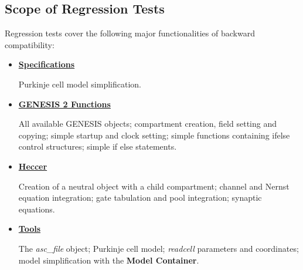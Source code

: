 \documentclass[12pt]{article}
\begin{document}
\subsection*{Scope of Regression Tests}

Regression tests cover the following major functionalities of backward compatibility:
\begin{itemize}
\item[]\href{http://www.neurospaces.org/neurospaces_project/ns-sli/tests/html/specifications/main.html}{\bf Specifications}

Purkinje cell model simplification.

\item[]\href{http://www.neurospaces.org/neurospaces_project/ns-sli/tests/html/specifications/core/main.html}{\bf GENESIS 2 Functions}

All available GENESIS objects; compartment creation, field setting and copying; simple startup and clock setting; simple functions containing ifelse control structures; simple if else statements.

\item[]\href{http://www.neurospaces.org/neurospaces_project/ns-sli/tests/html/specifications/heccer/main.html}{\bf Heccer}

Creation of a neutral object with a child compartment; channel and Nernst equation integration; gate tabulation and pool integration; synaptic equations.

\item[]\href{http://www.neurospaces.org/neurospaces_project/ns-sli/tests/html/specifications/tools/main.html}{\bf Tools}

The {\it asc\_file} object; Purkinje cell model; {\it readcell} parameters and coordinates; model simplification with the {\bf Model Container}.

\end{itemize}
\end{document}

